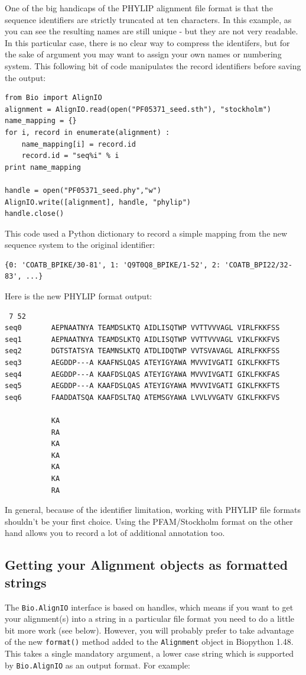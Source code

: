 \documentclass{report}
\begin{document}
One of the big handicaps of the PHYLIP alignment file format is that the sequence identifiers are strictly truncated at ten characters.  In this example, as you can see the resulting names are still unique - but they are not very readable.  In this particular case, there is no clear way to compress the identifers, but for the sake of argument you may want to assign your own names or numbering system.  This following bit of code manipulates the record identifiers before saving the output:

\begin{verbatim}
from Bio import AlignIO
alignment = AlignIO.read(open("PF05371_seed.sth"), "stockholm")
name_mapping = {}
for i, record in enumerate(alignment) :
    name_mapping[i] = record.id
    record.id = "seq%i" % i
print name_mapping

handle = open("PF05371_seed.phy","w")
AlignIO.write([alignment], handle, "phylip")
handle.close()
\end{verbatim}

\noindent This code used a Python dictionary to record a simple mapping from the new sequence system to the original identifier:
\begin{verbatim}
{0: 'COATB_BPIKE/30-81', 1: 'Q9T0Q8_BPIKE/1-52', 2: 'COATB_BPI22/32-83', ...}
\end{verbatim}

\noindent Here is the new PHYLIP format output:
\begin{verbatim}
 7 52
seq0       AEPNAATNYA TEAMDSLKTQ AIDLISQTWP VVTTVVVAGL VIRLFKKFSS
seq1       AEPNAATNYA TEAMDSLKTQ AIDLISQTWP VVTTVVVAGL VIKLFKKFVS
seq2       DGTSTATSYA TEAMNSLKTQ ATDLIDQTWP VVTSVAVAGL AIRLFKKFSS
seq3       AEGDDP---A KAAFNSLQAS ATEYIGYAWA MVVVIVGATI GIKLFKKFTS
seq4       AEGDDP---A KAAFDSLQAS ATEYIGYAWA MVVVIVGATI GIKLFKKFAS
seq5       AEGDDP---A KAAFDSLQAS ATEYIGYAWA MVVVIVGATI GIKLFKKFTS
seq6       FAADDATSQA KAAFDSLTAQ ATEMSGYAWA LVVLVVGATV GIKLFKKFVS

           KA
           RA
           KA
           KA
           KA
           KA
           RA
\end{verbatim}

\noindent In general, because of the identifier limitation, working with PHYLIP file formats shouldn't be your first choice.  Using the PFAM/Stockholm format on the other hand allows you to record a lot of additional annotation too.

\subsection{Getting your Alignment objects as formatted strings}
\label{sec:alignment-format-method}
The \verb|Bio.AlignIO| interface is based on handles, which means if you want to get your alignment(s) into a string in a particular file format you need to do a little bit more work (see below).  
However, you will probably prefer to take advantage of the new \verb|format()| method added to the \verb|Alignment| object in Biopython 1.48.  This takes a single mandatory argument, a lower case string which is supported by \verb|Bio.AlignIO| as an output format.  For example:
\end{document}
